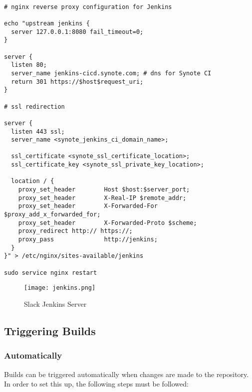 \begin{listing}[H]
\begin{verbatim}

# nginx reverse proxy configuration for Jenkins

echo "upstream jenkins {
  server 127.0.0.1:8080 fail_timeout=0;
}

server {
  listen 80;
  server_name jenkins-cicd.synote.com; # dns for Synote CI
  return 301 https://$host$request_uri;
}

# ssl redirection

server {
  listen 443 ssl;
  server_name <synote_jenkins_ci_domain_name>;

  ssl_certificate <synote_ssl_certificate_location>;
  ssl_certificate_key <synote_ssl_private_key_location>;

  location / {
    proxy_set_header        Host $host:$server_port;
    proxy_set_header        X-Real-IP $remote_addr;
    proxy_set_header        X-Forwarded-For $proxy_add_x_forwarded_for;
    proxy_set_header        X-Forwarded-Proto $scheme;
    proxy_redirect http:// https://;
    proxy_pass              http://jenkins;
  }
}" > /etc/nginx/sites-available/jenkins

sudo service nginx restart

\end{verbatim}
\label{lst:make-jenkins-available}
\end{listing}

\begin{figure}[!hbt]
  	\centering
 	\texttt{[image: jenkins.png]}
  	\caption{Slack Jenkins Server}
 	\label{fig:synote-jenkins-server}
\end{figure}

\subsection{Triggering Builds}
\label{subsec:triggering-builds}

\subsubsection{Automatically}
\label{subsubsec:triggering-builds-automatically}

Builds can be triggered automatically when changes are made to the repository. In order to set this up, the following steps must be followed:

